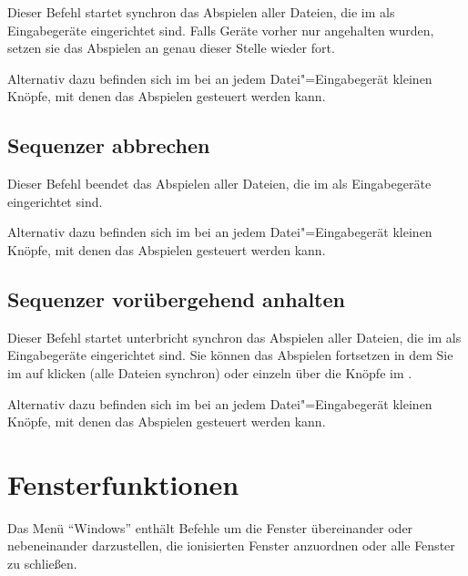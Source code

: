 Dieser Befehl startet synchron das Abspielen aller Dateien, die im
 als Eingabegeräte
eingerichtet sind. Falls Geräte vorher nur angehalten wurden, setzen
sie das Abspielen an genau dieser Stelle wieder fort.


Alternativ dazu befinden sich im
 bei
 an jedem
Datei"=Eingabegerät kleinen Knöpfe, mit denen das Abspielen gesteuert
werden kann.


\subsection{Sequenzer abbrechen}\label{sec:MI_INDEVSTOP}


Dieser Befehl beendet das Abspielen aller Dateien, die im
 als Eingabegeräte
eingerichtet sind.


Alternativ dazu befinden sich im
 bei
 an jedem
Datei"=Eingabegerät kleinen Knöpfe, mit denen das Abspielen gesteuert
werden kann.


\subsection{Sequenzer vorübergehend anhalten}
\label{sec:MI_INDEVPAUSE}

Dieser Befehl startet unterbricht synchron das Abspielen aller
Dateien, die im  als
Eingabegeräte eingerichtet sind. Sie können das Abspielen fortsetzen
in dem Sie im 
 auf
 klicken (alle Dateien synchron) oder
einzeln über die Knöpfe im .


Alternativ dazu befinden sich im
 bei
 an jedem
Datei"=Eingabegerät kleinen Knöpfe, mit denen das Abspielen gesteuert
werden kann.

\iffalse  %
\section{Fensterfunktionen}\label{sec:MS_WINDOW}
Das Menü "`Windows"' enthält Befehle um die Fenster übereinander 
oder nebeneinander darzustellen, die ionisierten Fenster anzuordnen 
oder alle Fenster zu schließen.

